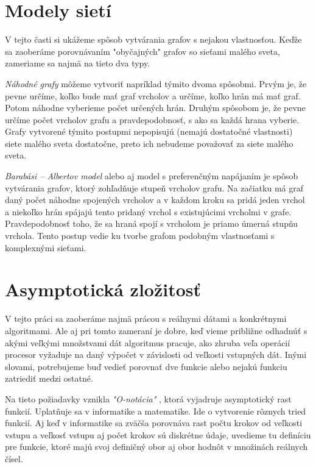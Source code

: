 \section{Modely sietí}

V tejto časti si ukážeme spôsob vytvárania grafov s nejakou vlastnosťou. Keďže 
sa zaoberáme porovnávaním "obyčajných" grafov so sieťami malého sveta, 
zameriame sa najmä na tieto dva typy.

\emph{Náhodné grafy} môžeme vytvoriť napríklad týmito dvoma spôsobmi. Prvým je, 
že pevne určíme, koľko bude mať graf vrcholov a určíme, koľko hrán má mať graf. 
Potom náhodne vyberieme počet určených hrán. Druhým spôsobom je, že pevne 
určíme počet vrcholov grafu a pravdepodobnosť, s ako sa každá hrana vyberie. 
Grafy vytvorené týmito postupmi nepopisujú (nemajú dostatočné vlastnosti) siete 
malého sveta dostatočne, preto ich nebudeme považovať za siete malého sveta.

\emph{Barabási -- Albertov model} alebo aj model s preferenčným napájaním je 
spôsob vytvárania grafov, ktorý zohľadňuje stupeň vrcholov grafu. Na začiatku 
má graf daný počet náhodne spojených vrcholov a v každom kroku sa pridá 
jeden vrchol a niekoľko hrán spájajú tento pridaný vrchol s existujúcimi 
vrcholmi v grafe. Pravdepodobnosť toho, že sa hraná spojí s vrcholom je priamo 
úmerná stupňu vrchola. Tento postup vedie ku tvorbe grafom podobným 
vlastnosťami s komplexnými sieťami.

\section{Asymptotická zložitosť}

V tejto práci sa zaoberáme najmä prácou s reálnymi dátami a konkrétnymi 
algoritmami. Ale aj pri tomto zameraní je dobre, keď vieme približne odhadnúť 
s akými veľkými množstvami dát algoritmus pracuje, ako zhruba veľa operácií 
procesor vyžaduje na daný výpočet v závislosti od veľkosti vstupných dát. Inými 
slovami, potrebujeme buď vedieť porovnať dve funkcie alebo nejakú funkciu 
zatriediť medzi ostatné. 

Na tieto požiadavky vznikla \emph{"O-notácia"} \citep{onot}, ktorá vyjadruje 
asymptotický rast funkcií. Uplatňuje sa v informatike a matematike. 
Ide o vytvorenie rôznych tried funkcií. Aj keď v informatike sa zväčša 
porovnáva rast počtu krokov od veľkosti vstupu a veľkosť vstupu aj počet krokov 
sú diskrétne údaje, uvedieme tu definíciu pre funkcie, ktoré majú svoj 
definičný obor aj obor hodnôt v množinách reálnych čísel.

